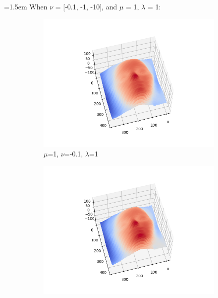 \documentclass{article}
\begin{document}
	\hangindent=1.5em \hspace{1.5em}When $\nu$ = [-0.1, -1, -10], and $\mu$ = 1, $\lambda$ = 1: \\
\begin{figure}[H]
	\centering
	\begin{subfigure}{0.33\textwidth}
		\centering
		\includegraphics[width=\textwidth]{./src/2f_v_change/faceCalibrated_mu_1_v_-0.1_lambda_1.png}
		\caption{$\mu$=1, $\nu$=-0.1, $\lambda$=1}
	\end{subfigure}
	\hfill
	\begin{subfigure}{0.32\textwidth}
		\centering
		\includegraphics[width=\textwidth]{./src/2f_v_change/faceCalibrated_mu_1_v_-1_lambda_1.png}

\end{subfigure}
\end{figure}
\end{document}
